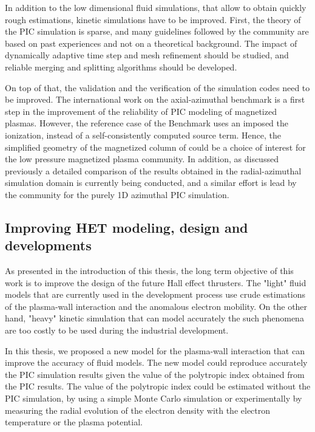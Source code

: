     In addition to the low dimensional fluid simulations, that allow to obtain quickly rough estimations, kinetic simulations have to be improved.
    First, the theory of the PIC simulation is sparse, and many guidelines followed by the community are based on past experiences and not on a theoretical background.
    The impact of dynamically adaptive time step and mesh refinement should be studied, and reliable merging and splitting algorithms should be developed.

    On top of that, the validation and the verification of the simulation codes need to be improved.
    The international work on the axial-azimuthal benchmark \citep{charoy2019} is a first step in the improvement of the reliability of PIC modeling of magnetized plasmas.
    However, the reference case of the Benchmark uses an imposed the ionization, instead of a self-consistently computed source term.
    Hence, the simplified geometry of the magnetized column of \citet{lucken2019} could be a choice of interest for the low pressure magnetized plasma community.
    In addition, as discussed previously a detailed comparison of the results obtained in the radial-azimuthal simulation domain is currently being conducted, and a similar effort is lead by the community for the purely 1D azimuthal PIC simulation.
    

  \subsection{Improving HET modeling, design and developments } 

    As presented in the introduction of this thesis, the long term objective of this work is to improve the design of the future Hall effect thrusters.
    The "light" fluid models that are currently used in the development process use crude estimations of the plasma-wall interaction and the anomalous electron mobility.
    On the other hand, "heavy" kinetic simulation that can model accurately the such phenomena are too costly to be used during the industrial development.

    In this thesis, we proposed a new model for the plasma-wall interaction that can improve the accuracy of fluid models.
    The new model could reproduce accurately the PIC simulation results given the value of the polytropic index obtained from the PIC results.
    The value of the polytropic index could be estimated without the PIC simulation, by using a simple Monte Carlo simulation or experimentally by measuring the radial evolution of the electron density with the electron temperature or the plasma potential.

